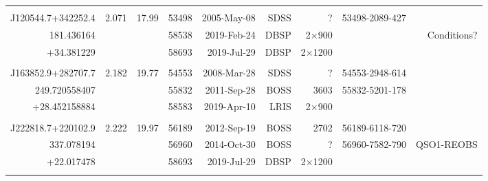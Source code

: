 \documentclass[a4paper,fleqn,usenatbib]{mnras}
\begin{document}
\begin{table}
\begin{tabular}{r  r  r r r   r r r r}
 \hline 
                                       &                &               &            &                              &                   &                             &  & \\
   J120544.7+342252.4   & 2.071     &   17.99   & 53498 & 2005-May-08   & SDSS             & ?                          & 53498-2089-427  & \\
          181.436164           &                &               & 58538 & 2019-Feb-24     & DBSP            &  2$\times$900    &                               &  Conditions? \\
         +34.381229           &                &               & 58693 & 2019-Jul-29      & DBSP            &  2$\times$1200   &                                &   \\
                                       &                &               &              &                           &                   &                             &  & \\
   J163852.9+282707.7   & 2.182     &   19.77    & 54553 & 2008-Mar-28    & SDSS             & ?                          & 54553-2948-614  & \\
      249.720558407	       &               &              & 55832  & 2011-Sep-28     & BOSS            &   3603                  & 55832-5201-178  & \\
       +28.452158884        &               &              & 58583 & 2019-Apr-10        & LRIS              &  2$\times$900    &   & \\
                                       &                &               &              &                           &                   &                             &  & \\
    J222818.7+220102.9   & 2.222     & 19.97    & 56189 & 2012-Sep-19     & BOSS             &  2702               & 56189-6118-720   & \\
        337.078194              &              &              & 56960 & 2014-Oct-30    & BOSS             & ?                         & 56960-7582-790     & QSO1-REOBS \\ 
        +22.017478                                &               &             & 58693 & 2019-Jul-29      & DBSP              & 2$\times$1200  &       &    \\
                                       &                &               &            &                             &                   &                              &  & \\

\end{tabular}
\end{table}
\end{document}
